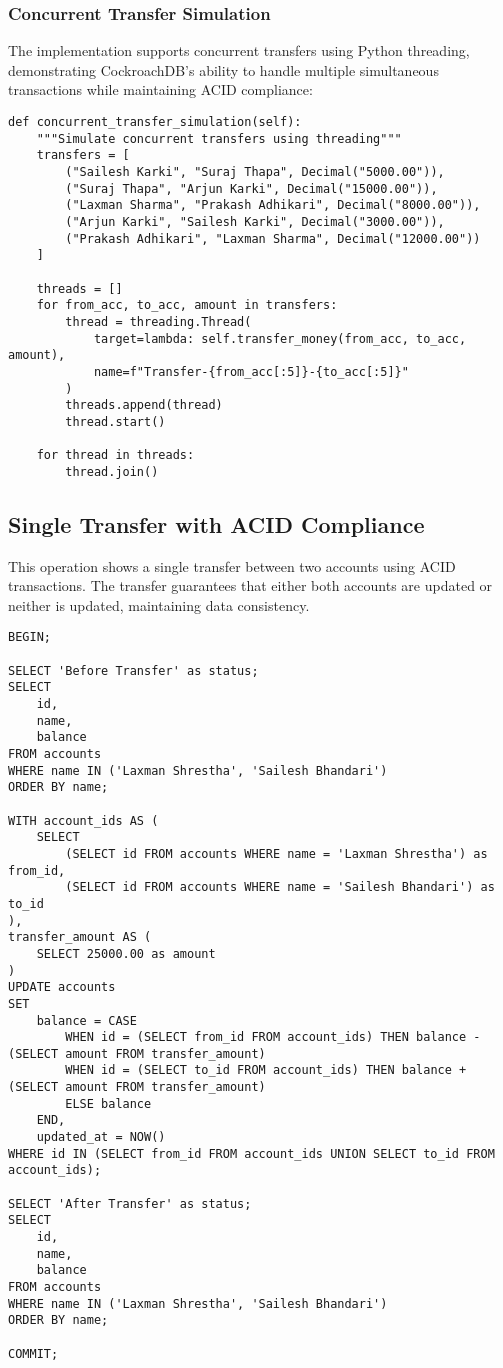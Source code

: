 \subsubsection{Concurrent Transfer Simulation}
The implementation supports concurrent transfers using Python threading, demonstrating CockroachDB's ability to handle multiple simultaneous transactions while maintaining ACID compliance:

\begin{verbatim}
def concurrent_transfer_simulation(self):
    """Simulate concurrent transfers using threading"""
    transfers = [
        ("Sailesh Karki", "Suraj Thapa", Decimal("5000.00")),
        ("Suraj Thapa", "Arjun Karki", Decimal("15000.00")),
        ("Laxman Sharma", "Prakash Adhikari", Decimal("8000.00")),
        ("Arjun Karki", "Sailesh Karki", Decimal("3000.00")),
        ("Prakash Adhikari", "Laxman Sharma", Decimal("12000.00"))
    ]

    threads = []
    for from_acc, to_acc, amount in transfers:
        thread = threading.Thread(
            target=lambda: self.transfer_money(from_acc, to_acc, amount),
            name=f"Transfer-{from_acc[:5]}-{to_acc[:5]}"
        )
        threads.append(thread)
        thread.start()

    for thread in threads:
        thread.join()
\end{verbatim}

\subsection{Single Transfer with ACID Compliance}
This operation shows a single transfer between two accounts using ACID transactions. The transfer guarantees that either both accounts are updated or neither is updated, maintaining data consistency.

\begin{verbatim}
BEGIN;

SELECT 'Before Transfer' as status;
SELECT
    id,
    name,
    balance
FROM accounts
WHERE name IN ('Laxman Shrestha', 'Sailesh Bhandari')
ORDER BY name;

WITH account_ids AS (
    SELECT
        (SELECT id FROM accounts WHERE name = 'Laxman Shrestha') as from_id,
        (SELECT id FROM accounts WHERE name = 'Sailesh Bhandari') as to_id
),
transfer_amount AS (
    SELECT 25000.00 as amount
)
UPDATE accounts
SET
    balance = CASE
        WHEN id = (SELECT from_id FROM account_ids) THEN balance - (SELECT amount FROM transfer_amount)
        WHEN id = (SELECT to_id FROM account_ids) THEN balance + (SELECT amount FROM transfer_amount)
        ELSE balance
    END,
    updated_at = NOW()
WHERE id IN (SELECT from_id FROM account_ids UNION SELECT to_id FROM account_ids);

SELECT 'After Transfer' as status;
SELECT
    id,
    name,
    balance
FROM accounts
WHERE name IN ('Laxman Shrestha', 'Sailesh Bhandari')
ORDER BY name;

COMMIT;
\end{verbatim}

